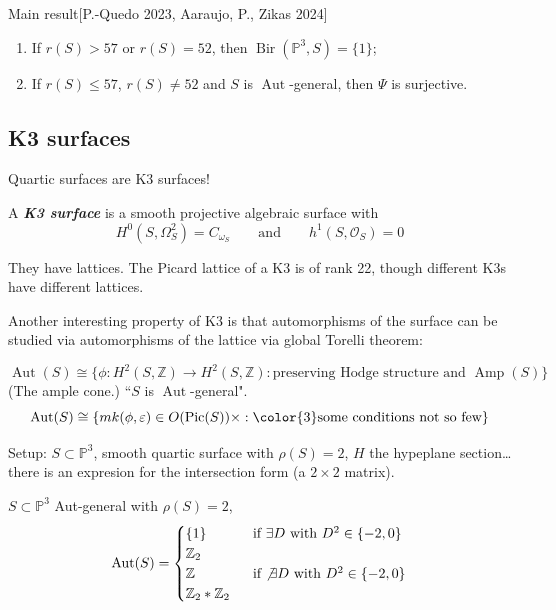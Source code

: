 \begin{thing6}{Main result}[P.-Quedo 2023, Aaraujo, P., Zikas 2024]\leavevmode
\begin{enumerate}[label=(\roman*)]
\item If \(r(S)> 57\) or \(r(S)=52\), then \(\operatorname{Bir}(\mathbb{P}^3,S)=\{1\}\);
\item If \(r(S) \leq 57\), \(r(S) \neq 52\) and \(S\) is \(\operatorname{Aut}\)-general, then \(\Psi\) is surjective.
\end{enumerate}
\end{thing6}


\subsection{K3 surfaces}

Quartic surfaces are K3 surfaces!

\begin{defn}\leavevmode
A \textit{\textbf{K3 surface}} is a smooth projective algebraic surface with
\[H^{0}(S,\Omega^{2}_S) = C_{\omega_S}\qquad \text{and} \qquad h^1(S,\mathcal{O}_S)=0\]
\end{defn}

They have lattices. The Picard lattice of a K3 is of rank 22, though different K3s have different lattices.

Another interesting property of K3 is that automorphisms of the surface can be studied via automorphisms of the lattice via global Torelli theorem:

\begin{thm}\leavevmode
\[\operatorname{Aut}(S)\cong \{\phi:H^{2}(S,\mathbb{Z})\to H^{2}(S,\mathbb{Z}):\text{preserving Hodge structure and }\operatorname{Am p}(S) \}\]
(The ample cone.) ``\(S\) is \(\operatorname{Aut}\)-general".
\[\operatorname{Aut}(S) \cong\{mk(\phi,\varepsilon) \in O(\operatorname{Pic}(S) ) \times :{\color{3}\text{some conditions not so few} }\}\]
\end{thm}

\begin{example}[Case \(\rho(S)=2\)]\leavevmode
Setup: \(S \subset \mathbb{P}^3\), smooth quartic surface with \(\rho(S)=2\), \(H\) the hypeplane section… there is an expresion for the intersection form (a \(2 \times 2\) matrix).
\end{example}

\begin{prop}\leavevmode
\(S \subset \mathbb{P}^3\) Aut-general with \(\rho(S)=2\),
\[\operatorname{Aut}(S)=\begin{cases}
	\{1\}\qquad & \text{ if \(\exists D\) with \(D^2 \in \{-2,0\}\)} \\
	\mathbb{Z}_2\qquad &\\
	\mathbb{Z} & \text{ if \(\not \exists D\) with \(D^2 \in \{-2,0\}\)} \\
	\mathbb{Z}_2 * \mathbb{Z}_2
\end{cases}\]
\end{prop}

